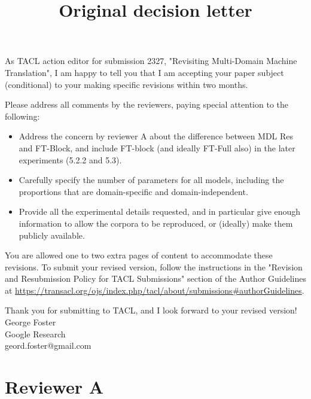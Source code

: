 \documentclass[12pt,times,a4paper,twoside]{article}
\title{Original decision letter}
\author{}
\date{}
\begin{document}
\maketitle
As TACL action editor for submission 2327, "Revisiting Multi-Domain Machine Translation", I am happy to tell you that I am accepting your paper subject (conditional) to your making specific revisions within two months.

Please address all comments by the reviewers, paying special attention to the following:
\begin{itemize}
	\item Address the concern by reviewer A about the difference between MDL Res and FT-Block, and include FT-block (and ideally FT-Full also) in the later experiments (5.2.2 and 5.3).
	\item Carefully specify the number of parameters for all models, including the proportions that are domain-specific and domain-independent.
	\item Provide all the experimental details requested, and in particular give enough information to allow the corpora to be reproduced, or (ideally) make them publicly available.
\end{itemize}

You are allowed one to two extra pages of content to accommodate these
revisions. To submit your revised version, follow the instructions in the
"Revision and Resubmission Policy for TACL Submissions" section of the
Author Guidelines at
\url{https://transacl.org/ojs/index.php/tacl/about/submissions\#authorGuidelines}.

Thank you for submitting to TACL, and I look forward to your revised
version! \\[2\parskip]

\noindent George Foster\\
\noindent Google Research\\
\noindent geord.foster@gmail.com

\section*{Reviewer A}
\end{document}
